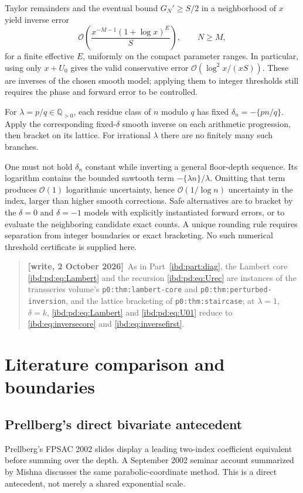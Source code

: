 \documentclass[11pt,letterpaper]{article}
\theoremstyle{remark}\newtheorem{remark}[theorem]{Remark}
\newcommand{\Oh}{\mathcal O}
\newenvironment{writenote}{\par\smallskip\begin{quote}\small\textbf{[write, 2 October 2026]}\ }{\end{quote}\smallskip}
\begin{document}
Taylor remainders and the eventual bound $G_N'\geq S/2$ in a neighborhood of $x$ yield inverse error
\begin{equation}\label{ibd:pd:eq:inverseerror}
 \Oh\!\left(\frac{x^{-M-1}(1+\log x)^E}{S}\right),\qquad N\geq M,
\end{equation}
for a finite effective $E$, uniformly on the compact parameter ranges. In particular, using only $x+U_0$ gives the valid conservative error $\Oh(\log^2x/(xS))$. These are inverses of the chosen smooth model; applying them to integer thresholds still requires the phase and forward error to be controlled.

For $\lambda=p/q\in\mathbb Q_{>0}$, each residue class of $n$ modulo $q$ has fixed $\delta_n=-\{pn/q\}$. Apply the corresponding fixed-$\delta$ smooth inverse on each arithmetic progression, then bracket on its lattice. For irrational $\lambda$ there are no finitely many such branches.

One must not hold $\delta_n$ constant while inverting a general floor-depth sequence. Its logarithm contains the bounded sawtooth term $-\{\lambda n\}/\lambda$. Omitting that term produces $\Oh(1)$ logarithmic uncertainty, hence $\Oh(1/\log n)$ uncertainty in the index, larger than higher smooth corrections. Safe alternatives are to bracket by the $\delta=0$ and $\delta=-1$ models with explicitly instantiated forward errors, or to evaluate the neighboring candidate exact counts. A unique rounding rule requires separation from integer boundaries or exact bracketing. No such numerical threshold certificate is supplied here.
\begin{writenote}As in Part~\ref{ibd:part:diag}, the Lambert core \eqref{ibd:pd:eq:Lambert} and the recursion \eqref{ibd:pd:eq:Urec} are instances of the transseries volume's \texttt{p0:thm:lambert-core} and \texttt{p0:thm:perturbed-inversion}, and the lattice bracketing of \texttt{p0:thm:staircase}; at $\lambda=1$, $\delta=k$, \eqref{ibd:pd:eq:Lambert} and \eqref{ibd:pd:eq:U01} reduce to \eqref{ibd:eq:inversecore} and \eqref{ibd:eq:inversefirst}.\end{writenote}

\section{Literature comparison and boundaries}\label{ibd:pd:sec:literature}
\subsection{Prellberg's direct bivariate antecedent}\label{ibd:pd:sec:prellberg}
Prellberg's FPSAC 2002 slides \cite[slide 17 of 26, physical PDF p.~59]{prellberg2002} display a leading two-index coefficient equivalent before summing over the depth. A September 2002 seminar account summarized by Mishna \cite[especially p.~49]{mishna2005} discusses the same parabolic-coordinate method. This is a direct antecedent, not merely a shared exponential scale.
\end{document}
